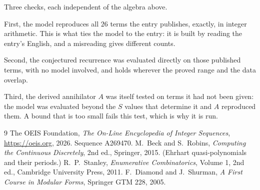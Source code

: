 \documentclass[11pt,a4paper]{article}
\theoremstyle{plain}
\theoremstyle{definition}
\begin{document}
Three checks, each independent of the algebra above.

First, the model reproduces all $26$ terms the entry publishes, exactly, in integer
arithmetic. This is what ties the model to the entry: it is built by reading the entry's
English, and a misreading gives different counts.

Second, the conjectured recurrence was evaluated directly on those published terms, with no
model involved, and holds wherever the proved range and the data overlap.

Third, the derived annihilator $A$ was itself tested on terms it had not been given: the model
was evaluated beyond the $S$ values that determine it and $A$ reproduced them. A bound that is
too small fails this test, which is why it is run.

\begin{thebibliography}{9}
 The OEIS Foundation, \emph{The On-Line Encyclopedia of Integer
Sequences}, \url{https://oeis.org}, 2026. Sequence A269470.
 M.~Beck and S.~Robins, \emph{Computing the Continuous Discretely},
2nd ed., Springer, 2015. (Ehrhart quasi-polynomials and their periods.)
 R.~P.~Stanley, \emph{Enumerative Combinatorics}, Volume 1, 2nd ed.,
Cambridge University Press, 2011.
 F.~Diamond and J.~Shurman, \emph{A First Course in Modular Forms},
Springer GTM 228, 2005.
\end{thebibliography}
\end{document}
